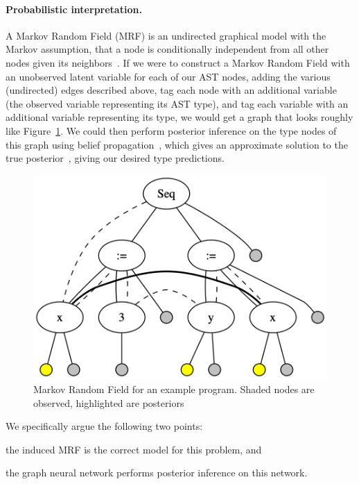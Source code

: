 \paragraph{Probabilistic interpretation.}
A Markov Random Field (MRF) is an undirected graphical model with the Markov assumption, that a node is conditionally independent from all other nodes given its neighbors~\cite{kinderman80markov}.
If we were to construct a Markov Random Field with an unobserved latent variable for each of our AST nodes, adding the various (undirected) edges described above, tag each node with an additional variable (the observed variable representing its AST type), and tag each variable with an additional variable representing its type, we would get a graph that looks roughly like Figure~\ref{fig:mrf-graph}.
We could then perform posterior inference on the type nodes of this graph using belief propagation~\cite{pearl2009causality}, which gives an approximate solution to the true posterior~\cite{weiss2000correctness}, giving our desired type predictions.
\begin{figure}
	\centering
	\includegraphics[width=\linewidth]{img/mrf_graph}
	\caption{Markov Random Field for an example program. Shaded nodes are observed, highlighted are posteriors}
	\label{fig:mrf-graph}
\end{figure}

We specifically argue the following two points:
\begin{enumerate*}[label=(\roman*)]
	\item the induced MRF is the correct model for this problem, and
	\item the graph neural network performs posterior inference on this network.
\end{enumerate*}

